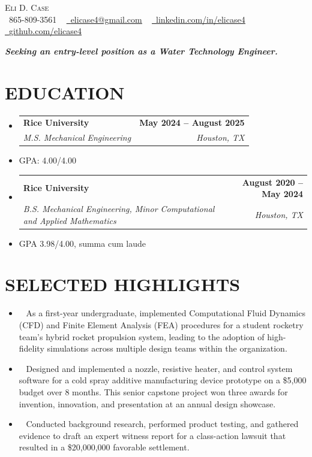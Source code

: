 \documentclass[letterpaper,11pt]{article}
\makeatletter
\newcommand{\resumeItem}[1]{
  \item \small{
    {#1 \vspace{-2pt}}
  }
}
\newcommand{\highlightItem}[1]{
  \item \textendash\ \small{
    {#1 \vspace{-2pt}}
  }
}
\newcommand{\resumeSubheading}[4]{
  \vspace{-2pt}\item
    \begin{tabular*}{1.0\textwidth}[t]{l@{\extracolsep{\fill}}r}
      \textbf{#1} & \textbf{\small #2} \\
      \textit{\small#3} & \textit{\small #4} \\
    \end{tabular*}\vspace{-7pt}
}
\newcommand{\resumeSubHeadingListStart}{\begin{itemize}[leftmargin=0.0in, label={}]}
\newcommand{\resumeSubHeadingListEnd}{\end{itemize}}
\makeatother
\begin{document}
\begin{center}
    {\large \scshape Eli D. Case} \\ \vspace{1pt}
    \small \raisebox{-0.1\height}\faPhone\ 865-809-3561 ~ \href{mailto:elicase4@gmail.com}{\raisebox{-0.2\height}\faEnvelope\  \underline{elicase4@gmail.com}} ~ 
    \href{https://linkedin.com/in/elicase4}{\raisebox{-0.2\height}\faLinkedin\ \underline{linkedin.com/in/elicase4}}  ~
    \href{https://github.com/elicase4}{\raisebox{-0.2\height}\faGithub\ \underline{github.com/elicase4}}
\end{center}

\begin{center}
  \vspace{4pt}
  \textit{\textbf{{Seeking an entry-level position as a Water Technology Engineer.}}}
  \vspace{-2pt}
\end{center}

\section{EDUCATION}

  \resumeSubHeadingListStart
    
    \resumeSubheading
      {Rice University}{May 2024 -- August 2025}
      {M.S. Mechanical Engineering}{Houston, TX}
      \resumeItem{GPA: 4.00/4.00}
    \resumeSubheading
      {Rice University}{August 2020 -- May 2024}
      {B.S. Mechanical Engineering, Minor Computational and Applied Mathematics}{Houston, TX}
      \resumeItem{GPA 3.98/4.00, summa cum laude}

  \resumeSubHeadingListEnd
\vspace{-10pt}

\section{SELECTED HIGHLIGHTS}
 \begin{itemize}[leftmargin=0.15in, label={}]
    \highlightItem{As a first-year undergraduate, implemented Computational Fluid Dynamics (CFD) and Finite Element Analysis (FEA) procedures for a student rocketry team's hybrid rocket propulsion system, leading to the adoption of high-fidelity simulations across multiple design teams within the organization.}

    \highlightItem{Designed and implemented a nozzle, resistive heater, and control system software for a cold spray additive manufacturing device prototype on a \$5,000 budget over 8 months. This senior capstone project won three awards for invention, innovation, and presentation at an annual design showcase.}

    \highlightItem{Conducted background research, performed product testing, and gathered evidence to draft an expert witness report for a class-action lawsuit that resulted in a \$20,000,000 favorable settlement.} 
    
\end{itemize}
\vspace{-10pt}
\end{document}

